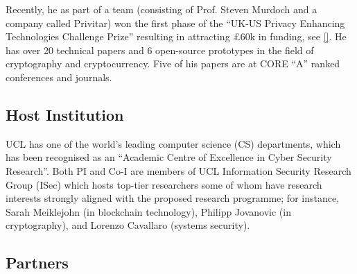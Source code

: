 Recently, he as part of a team (consisting of Prof. Steven Murdoch and a company called Privitar) won the first phase of the “UK-US Privacy Enhancing Technologies Challenge Prize” resulting in attracting £60k in funding, see \href{https://www.ucl.ac.uk/computer-science/news/2022/dec/ucl-computer-sciences-success-privacy-enhancing-technologies-challenge}{[\x]}.  He has over 20 technical papers and 6 open-source prototypes in the field of cryptography and cryptocurrency. Five of his papers are at CORE “A” ranked conferences and journals.


\subsection{Host Institution}
UCL has one of the world's leading computer science (CS) departments, which has been recognised as an “Academic Centre of Excellence in Cyber Security Research”. Both PI and Co-I are members of UCL Information Security Research Group (ISec) which hosts top-tier researchers some of whom have research interests strongly aligned with the proposed research programme; for instance, Sarah Meiklejohn  (in blockchain technology), Philipp Jovanovic (in cryptography), and Lorenzo Cavallaro (systems security). 


\subsection{Partners}





